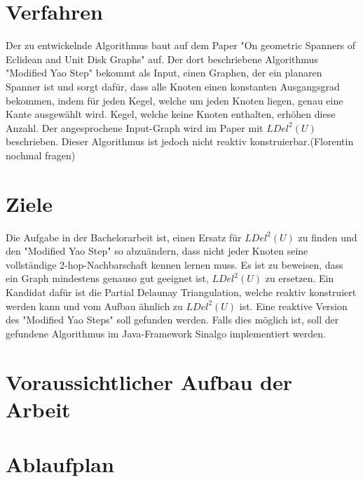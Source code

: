 \documentclass[a4paper,DIV10,10pt,headsepline,smallheadings]{scrreprt}
\begin{document}
\section{Verfahren}
Der zu entwickelnde Algorithmus baut auf dem Paper "On geometric Spanners of Eclidean and Unit Disk Graphs" auf.
Der dort beschriebene Algorithmus "Modified Yao Step" bekommt als Input, einen Graphen, der ein planaren Spanner ist und sorgt dafür, dass alle Knoten einen konstanten Ausgangsgrad bekommen, indem für jeden Kegel, welche um jeden Knoten liegen, genau eine Kante ausgewählt wird.
Kegel, welche keine Knoten enthalten, erhöhen diese Anzahl.
Der angesprochene Input-Graph wird im Paper mit $LDel^2(U) $ beschrieben.
Dieser Algorithmus ist jedoch nicht reaktiv konstruierbar.(Florentin nochmal fragen)


\section{Ziele}
Die Aufgabe in der Bachelorarbeit ist, einen Ersatz für $LDel^2(U) $ zu finden und den "Modified Yao Step" so abzuändern, dass nicht jeder Knoten seine vollständige 2-hop-Nachbarschaft kennen lernen muss.
Es ist zu beweisen, dass ein Graph mindestens genauso gut geeignet ist, $LDel^2(U) $ zu ersetzen.
Ein Kandidat dafür ist die Partial Delaunay Triangulation, welche reaktiv konstruiert werden kann und vom Aufbau ähnlich zu $LDel^2(U) $ ist.
Eine reaktive Version des "Modified Yao Steps" soll gefunden werden.
Falls dies möglich ist, soll der gefundene Algorithmus im Java-Framework Sinalgo implementiert werden.
\section{Voraussichtlicher Aufbau der Arbeit}


\section{Ablaufplan}

\begin{table}[h]
\end{table}
\end{document}
